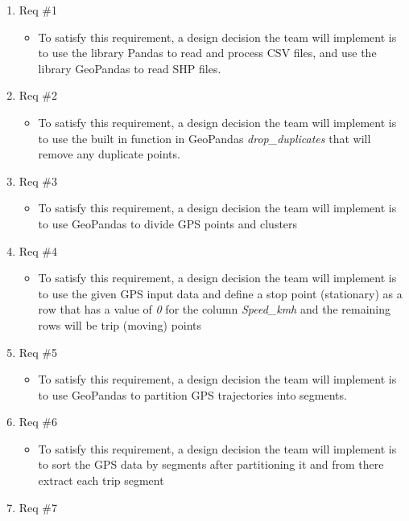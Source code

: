 \documentclass[12pt, titlepage]{article}
\begin{document}
\begin{enumerate}
    \item Req \#1
    \begin{itemize}
        \item To satisfy this requirement, a design decision the team will implement is to use the library Pandas to read and process CSV files, and use the library GeoPandas to read SHP files.
    \end{itemize}
    \item Req \#2
    \begin{itemize}
        \item To satisfy this requirement, a design decision the team will implement is to use the built in function in GeoPandas \emph{drop\_duplicates} that will remove any duplicate points.
    \end{itemize}
    \item Req \#3
    \begin{itemize}
        \item To satisfy this requirement, a design decision the team will implement is to use GeoPandas to divide GPS points and clusters
    \end{itemize}
    \item Req \#4
    \begin{itemize}
        \item To satisfy this requirement, a design decision the team will implement is to use the given GPS input data and define a stop point (stationary) as a row that has a value of \emph{0} for the column \emph{Speed\_kmh} and the remaining rows will be trip (moving) points %
    \end{itemize}
    \item Req \#5
    \begin{itemize}
        \item To satisfy this requirement, a design decision the team will implement is to use GeoPandas to partition GPS trajectories into segments.
    \end{itemize}
    \item Req \#6
    \begin{itemize}
        \item To satisfy this requirement, a design decision the team will implement is to sort the GPS data by segments after partitioning it and from there extract each trip segment
    \end{itemize}
    \item Req \#7
    \begin{itemize}

\end{itemize}
\end{enumerate}
\end{document}
